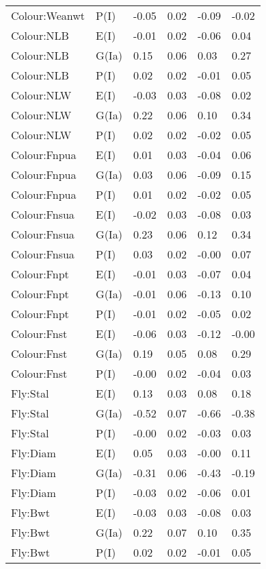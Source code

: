 \begin{center}
\begin{longtable}{|p{1.1in}|p{0.7in}|p{0.7in}|p{0.6in}|p{0.6in}|p{0.6in}|}
  Colour:Weanwt & P(I) & -0.05 & 0.02 & -0.09 & -0.02 \\ 
  Colour:NLB & E(I) & -0.01 & 0.02 & -0.06 & 0.04 \\ 
  Colour:NLB & G(Ia) & 0.15 & 0.06 & 0.03 & 0.27 \\ 
  Colour:NLB & P(I) & 0.02 & 0.02 & -0.01 & 0.05 \\ 
  Colour:NLW & E(I) & -0.03 & 0.03 & -0.08 & 0.02 \\ 
  Colour:NLW & G(Ia) & 0.22 & 0.06 & 0.10 & 0.34 \\ 
  Colour:NLW & P(I) & 0.02 & 0.02 & -0.02 & 0.05 \\ 
  Colour:Fnpua & E(I) & 0.01 & 0.03 & -0.04 & 0.06 \\ 
  Colour:Fnpua & G(Ia) & 0.03 & 0.06 & -0.09 & 0.15 \\ 
  Colour:Fnpua & P(I) & 0.01 & 0.02 & -0.02 & 0.05 \\ 
  Colour:Fnsua & E(I) & -0.02 & 0.03 & -0.08 & 0.03 \\ 
  Colour:Fnsua & G(Ia) & 0.23 & 0.06 & 0.12 & 0.34 \\ 
  Colour:Fnsua & P(I) & 0.03 & 0.02 & -0.00 & 0.07 \\ 
  Colour:Fnpt & E(I) & -0.01 & 0.03 & -0.07 & 0.04 \\ 
  Colour:Fnpt & G(Ia) & -0.01 & 0.06 & -0.13 & 0.10 \\ 
  Colour:Fnpt & P(I) & -0.01 & 0.02 & -0.05 & 0.02 \\ 
  Colour:Fnst & E(I) & -0.06 & 0.03 & -0.12 & -0.00 \\ 
  Colour:Fnst & G(Ia) & 0.19 & 0.05 & 0.08 & 0.29 \\ 
  Colour:Fnst & P(I) & -0.00 & 0.02 & -0.04 & 0.03 \\ 
  Fly:Stal & E(I) & 0.13 & 0.03 & 0.08 & 0.18 \\ 
  Fly:Stal & G(Ia) & -0.52 & 0.07 & -0.66 & -0.38 \\ 
  Fly:Stal & P(I) & -0.00 & 0.02 & -0.03 & 0.03 \\ 
  Fly:Diam & E(I) & 0.05 & 0.03 & -0.00 & 0.11 \\ 
  Fly:Diam & G(Ia) & -0.31 & 0.06 & -0.43 & -0.19 \\ 
  Fly:Diam & P(I) & -0.03 & 0.02 & -0.06 & 0.01 \\ 
  Fly:Bwt & E(I) & -0.03 & 0.03 & -0.08 & 0.03 \\ 
  Fly:Bwt & G(Ia) & 0.22 & 0.07 & 0.10 & 0.35 \\ 
  Fly:Bwt & P(I) & 0.02 & 0.02 & -0.01 & 0.05 \\ 

\end{longtable}
\end{center}
